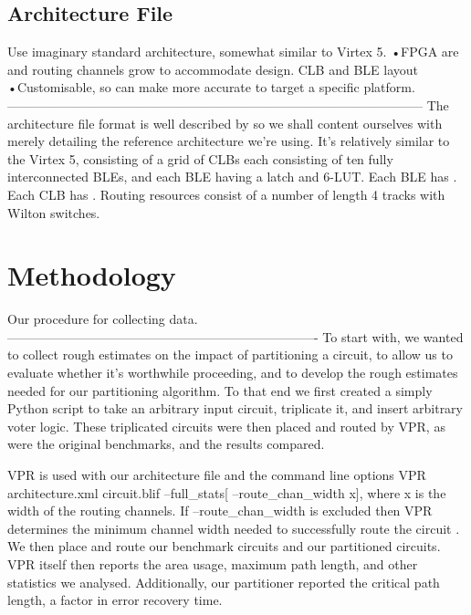 \documentclass[12pt,draft,a4paper,oneside]{memoir} %
\begin{document}
\subsection{Architecture File}
Use imaginary standard architecture, somewhat similar to Virtex 5.
•FPGA are and routing channels grow to accommodate design.
CLB and BLE layout
•Customisable, so can make more accurate to target a specific platform.
--------------------------------------------------------------------------------------------------
The architecture file format is well described by  so we shall content ourselves with merely detailing the reference architecture we're using.
It's relatively similar to the Virtex 5, consisting of a grid of \acp{CLB} each consisting of ten fully interconnected \acp{BLE}, and each \ac{BLE} having a latch and 6-\ac{LUT}.
Each \ac{BLE} has . Each \ac{CLB} has .
Routing resources consist of a number of length 4 tracks with \ac{Wilton} switches.

\section{Methodology}
Our procedure for collecting data.
-------------------------------------------------------------------------
To start with, we wanted to collect rough estimates on the impact of partitioning a circuit, to allow us to evaluate whether it's worthwhile proceeding, and to develop the rough estimates needed for our partitioning algorithm. To that end we first created a simply Python script to take an arbitrary input circuit, triplicate it, and insert arbitrary voter logic. These triplicated circuits were then placed and routed by VPR, as were the original benchmarks, and the results compared.

VPR is used with our architecture file  and the command line options VPR architecture.xml circuit.blif --full\_stats[ --route\_chan\_width x], where x is the width of the routing channels. If --route\_chan\_width is excluded then VPR determines the minimum channel width needed to successfully route the circuit . We then place and route our benchmark circuits and our partitioned circuits. VPR itself then reports the area usage, maximum path length, and other statistics we analysed. Additionally, our partitioner reported the critical path length, a factor in error recovery time.
\end{document}
